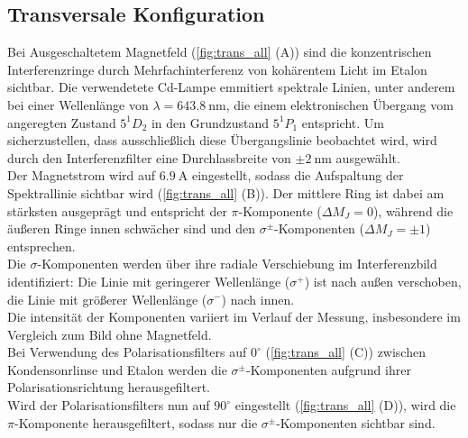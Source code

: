 \subsection{Transversale Konfiguration}
\begin{figure}[ht]
    \begin{center}
        \label{fig:trans_all}
        \label{fig:trans_strom}
    \end{center}
\end{figure}
\clearpage
\noindent Bei Ausgeschaltetem Magnetfeld (\cref{fig:trans_all} (A)) sind die konzentrischen Interferenzringe durch Mehrfachinterferenz von kohärentem Licht im Etalon sichtbar. Die verwendetete Cd-Lampe emmitiert spektrale Linien, unter anderem bei einer Wellenlänge von $\lambda = \SI{643,8}{\nano\meter}$, die einem elektronischen Übergang vom angeregten Zustand $5^1D_2$ in den Grundzustand $5^1P_1$ entspricht. Um sicherzustellen, dass ausschließlich diese Übergangslinie beobachtet wird, wird durch den Interferenzfilter eine Durchlassbreite von $\pm \SI{2}{\nano\meter}$ ausgewählt.
\vspace{0.2cm}\\
Der Magnetstrom wird auf $\SI{6,9}{\ampere}$ eingestellt, sodass die Aufspaltung der Spektrallinie sichtbar wird (\cref{fig:trans_all} (B)). Der mittlere Ring ist dabei am stärksten ausgeprägt und entspricht der $\pi$-Komponente ($\Delta M_J=0$), während die äußeren Ringe innen schwächer sind und den $\sigma^\pm$-Komponenten ($\Delta M_J=\pm 1$) entsprechen.\\ 
Die $\sigma$-Komponenten werden über ihre radiale Verschiebung im Interferenzbild identifiziert: Die Linie mit geringerer Wellenlänge ($\sigma^+$) ist nach außen verschoben, die Linie mit größerer Wellenlänge ($\sigma^-$) nach innen.\\
Die intensität der Komponenten variiert im Verlauf der Messung, insbesondere im Vergleich zum Bild ohne Magnetfeld.
\vspace{0.2cm}\\
\noindent Bei Verwendung des Polarisationsfilters auf $0^{\circ}$ (\cref{fig:trans_all} (C)) zwischen Kondensonrlinse und Etalon werden die $\sigma^\pm$-Komponenten aufgrund ihrer Polarisationsrichtung herausgefiltert.
\vspace{0.2cm}\\
\noindent Wird der Polarisationsfilters nun auf $90^{\circ}$ eingestellt (\cref{fig:trans_all} (D)), wird die $\pi$-Komponente herausgefiltert, sodass nur die $\sigma^\pm$-Komponenten sichtbar sind.
%
%
